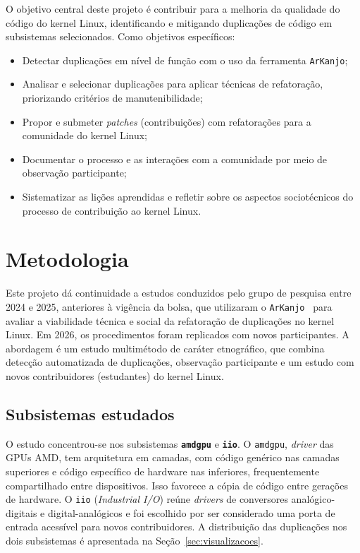 \documentclass[oneside]{abntlatex}
\begin{document}
O objetivo central deste projeto é contribuir para a melhoria da qualidade do código do kernel Linux, identificando e mitigando duplicações de código em subsistemas selecionados. Como objetivos específicos:

\begin{itemize}
    \item Detectar duplicações em nível de função com o uso da ferramenta \texttt{ArKanjo};

    \item Analisar e selecionar duplicações para aplicar técnicas de refatoração, priorizando critérios de manutenibilidade;

    \item Propor e submeter \textit{patches} (contribuições) com refatorações para a comunidade do kernel Linux;

    \item Documentar o processo e as interações com a comunidade por meio de observação participante;

    \item Sistematizar as lições aprendidas e refletir sobre os aspectos sociotécnicos do processo de contribuição ao kernel Linux.
\end{itemize}

\section{Metodologia}\label{sec:metodologia}

Este projeto dá continuidade a estudos conduzidos pelo grupo de pesquisa entre 2024 e 2025\cite{arcanjo2025arkanjo,duplicationdry}, anteriores à vigência da bolsa, que utilizaram o \texttt{ArKanjo}~\cite{arcanjo2025arkanjo} para avaliar a viabilidade técnica e social da refatoração de duplicações no kernel Linux. Em 2026, os procedimentos foram replicados com novos participantes. A abordagem é um estudo multimétodo de caráter etnográfico, que combina detecção automatizada de duplicações, observação participante\cite{Seaman2008,Robson2016,Wen2021} e um estudo com novos contribuidores (estudantes) do kernel Linux.

\subsection{Subsistemas estudados}

O estudo concentrou-se nos subsistemas \texttt{\textbf{amdgpu}} e \texttt{\textbf{iio}}. O \texttt{amdgpu}, \textit{driver} das GPUs AMD, tem arquitetura em camadas, com código genérico nas camadas superiores e código específico de hardware nas inferiores, frequentemente compartilhado entre dispositivos\cite{Wang2011}. Isso favorece a cópia de código entre gerações de hardware\cite{duplicationdry}. O \texttt{iio} (\textit{Industrial I/O}) reúne \textit{drivers} de conversores analógico-digitais e digital-analógicos e foi escolhido por ser considerado uma porta de entrada acessível para novos contribuidores\cite{duplicationdry}. A distribuição das duplicações nos dois subsistemas é apresentada na Seção~\ref{sec:visualizacoes}.
\end{document}
